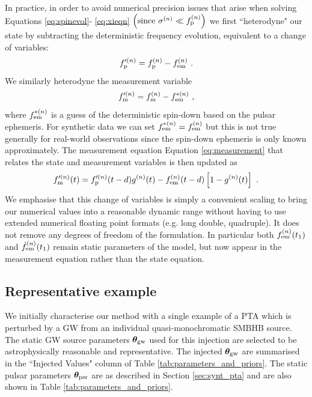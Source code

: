 \documentclass[fleqn,usenatbib,useAMS]{mnras}
\begin{document}
In practice, in order to avoid numerical precision issues that arise when solving Equations \eqref{eq:spinevol}- \eqref{eq:xieqn} $\left ( \text{since } \sigma^{(n)} \ll f_{\rm p}^{(n)} \right)$ we first ``heterodyne" our state by subtracting the deterministic frequency evolution, equivalent to a change of variables:
\begin{equation}
	f_{\rm p}^{\prime (n)} = f_{\rm p}^{(n)} - f_{\rm em}^{(n)} \ .
\end{equation}  
We similarly heterodyne the measurement variable 
\begin{equation}
	f_{\rm m}^{\prime (n)} = f_{\rm m}^{(n)} - f_{\rm em}^{*(n)} \ ,
\end{equation}
where $ f_{\rm em}^{*(n)}$ is a guess of the deterministic spin-down based on the pulsar ephemeris. For synthetic data we can set $ f_{\rm em}^{*(n)} = f_{\rm em}^{(n)}$ but this is not true generally for real-world observations since the spin-down ephemeris is only known approximately. The measurement equation Equation \eqref{eq:measurement} that relates the state and measurement variables is then updated as 
\begin{equation}
	f_{\rm m}^{\prime (n)}(t) = f_{\rm p}^{\prime (n)}(t-d) g^{(n)}(t) -  f_{\rm em}^{(n)}(t-d)\left[ 1-g^{(n)}(t)\right] \ .
	\label{eq:measurement_cov}
\end{equation}
We emphasise that this change of variables is simply a convenient scaling to bring our numerical values into a reasonable dynamic range without having to use extended numerical floating point formats (e.g. long double, quadruple). It does not remove any degrees of freedom of the formulation. In particular both $f_{\rm em}^{(n)}(t_1)$
and $\dot{f}_{\rm em}^{(n)}(t_1)$ remain static parameters of the model, but now appear in the measurement equation rather than the state equation.


\subsection{Representative example}\label{sec:rep_example}
We initially characterise our method with a single example of a PTA which is perturbed by a GW from an individual quasi-monochromatic SMBHB source. The static GW source parameters $\boldsymbol{\theta}_{\rm gw}$ used for this injection are selected to be astrophysically reasonable and representative. The injected $\boldsymbol{\theta}_{\rm gw}$ are summarised in the ``Injected Values" column of Table \ref{tab:parameters_and_priors}. The static pulsar parameters $\boldsymbol{\theta}_{\rm psr}$ are as described in Section \ref{sec:synt_pta} and are also shown in Table \ref{tab:parameters_and_priors}. 
\end{document}
